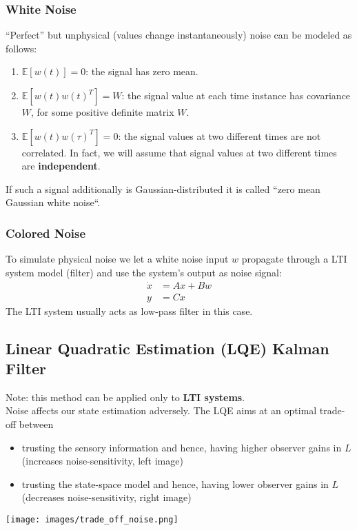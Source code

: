 \subsubsection{White Noise}
``Perfect'' but unphysical (values change instantaneously) noise can be modeled as follows:
\begin{enumerate}
    \item $\mathbb{E}[w(t)]=0$: the signal has zero mean.
    \item $\mathbb{E}[w(t){w(t)}^T]=W$: the signal value at each time instance has covariance $W$, for some positive definite matrix $W$.
    \item $\mathbb{E}[w(t){w(\tau)}^T]=0$: the signal values at two different times are not correlated. In fact, we will assume that signal values at two different times are \textbf{independent}.
\end{enumerate}
If such a signal additionally is Gaussian-distributed it is called ``zero mean Gaussian white noise``.

\subsubsection{Colored Noise}
To simulate physical noise we let a white noise input $w$ propagate through a LTI system model (filter) and use the system's output as noise signal:
\begin{align*}
    \dot{x} & =Ax+Bw \\
    y       & = Cx
\end{align*}
The LTI system usually acts as low-pass filter in this case.


\subsection{Linear Quadratic Estimation (LQE) Kalman Filter}
Note: this method can be applied only to \textbf{LTI systems}.\\
Noise affects our state estimation adversely. The LQE aims at an optimal trade-off between
\begin{itemize}
    \item trusting the sensory information and hence, having higher observer gains in $L$ (increases noise-sensitivity, left image)
    \item trusting the state-space model and hence, having lower observer gains in $L$ (decreases noise-sensitivity, right image)
\end{itemize}
\begin{center}
    \texttt{[image: images/trade\_off\_noise.png]}
\end{center}


